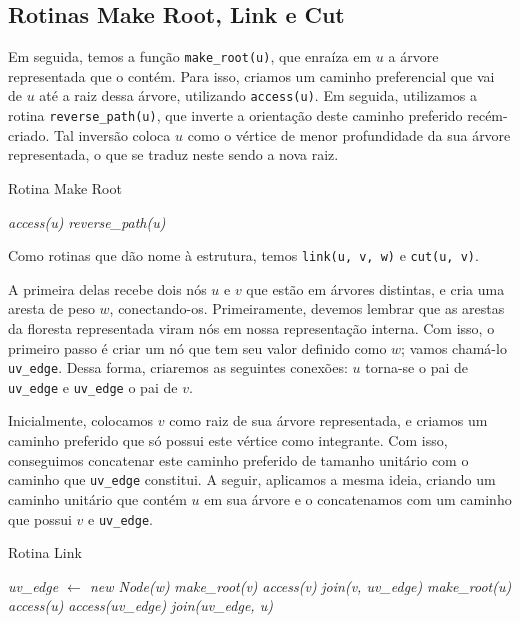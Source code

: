 \subsection{Rotinas Make Root, Link e Cut}
\label{subsection:lct-make-root}

Em seguida, temos a função \texttt{make\_root(u)}, que enraíza em $u$ a árvore representada que o contém. Para isso, criamos um caminho preferencial que vai de $u$ até a raiz dessa árvore, utilizando \texttt{access(u)}. Em seguida, utilizamos a rotina \texttt{reverse\_path(u)}, que inverte a orientação deste caminho preferido recém-criado. Tal inversão coloca $u$ como o vértice de menor profundidade da sua árvore representada, o que se traduz neste sendo a nova raiz.

\begin{algorithm}[h!]
    \caption{Rotina Make Root}\label{lct:make-root}
    \begin{algorithmic}[1]
        \State \emph{access(u)}
        \State \emph{reverse\_path(u)}
        \EndFunction
    \end{algorithmic}
\end{algorithm}

Como rotinas que dão nome à estrutura, temos \texttt{link(u, v, w)} e \texttt{cut(u, v)}.

A primeira delas recebe dois nós $u$ e $v$ que estão em árvores distintas, e cria uma aresta de peso $w$, conectando-os. Primeiramente, devemos lembrar que as arestas da floresta representada viram nós em nossa representação interna. Com isso, o primeiro passo é criar um nó que tem seu valor definido como $w$; vamos chamá-lo \texttt{uv\_edge}. Dessa forma, criaremos as seguintes conexões: $u$ torna-se o pai de \texttt{uv\_edge} e \texttt{uv\_edge} o pai de $v$.

Inicialmente, colocamos $v$ como raiz de sua árvore representada, e criamos um caminho preferido que só possui este vértice como integrante. Com isso, conseguimos concatenar este caminho preferido de tamanho unitário com o caminho que \texttt{uv\_edge} constitui. A seguir, aplicamos a mesma ideia, criando um caminho unitário que contém $u$ em sua árvore e o concatenamos com um caminho que possui $v$ e \texttt{uv\_edge}.

\begin{algorithm}[h!]
    \caption{Rotina Link}\label{lct:link}
    \begin{algorithmic}[1]
        \State \emph{uv\_edge $\gets$ new Node(w)} 
        \State {}
        \State \emph{make\_root(v)}
        \State \emph{access(v)}
        \State \emph{join(v, uv\_edge)}
        \State {}
        \State \emph{make\_root(u)}
        \State \emph{access(u)}
        \State \emph{access(uv\_edge)}
        \State \emph{join(uv\_edge, u)}
        \EndFunction
    \end{algorithmic}
\end{algorithm}

